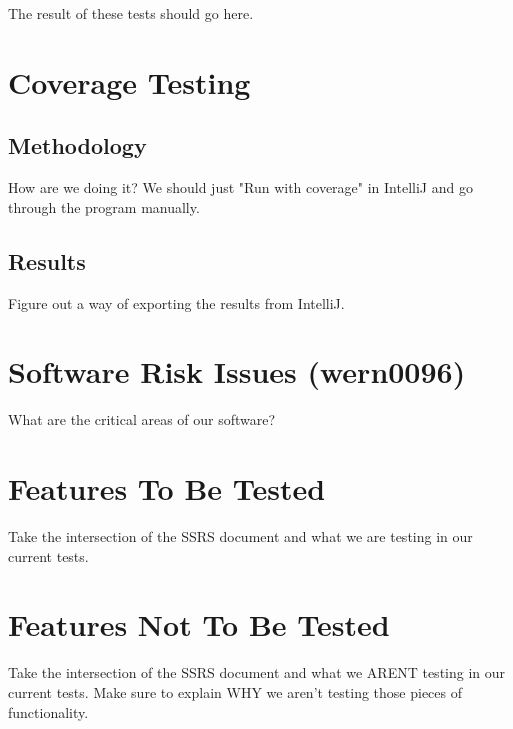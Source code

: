 \documentclass[14pt, a4paper]{article}
\begin{document}
The result of these tests should go here.

\newpage

\section{Coverage Testing}

\subsection{Methodology}

How are we doing it? We should just "Run with coverage" in IntelliJ and go through the program manually.

\newpage

\subsection{Results}

Figure out a way of exporting the results from IntelliJ.

\newpage
\section{Software Risk Issues (wern0096)}

What are the critical areas of our software?


\newpage
\section{Features To Be Tested}

Take the intersection of the SSRS document and what we are testing in our current tests.

\newpage
\section{Features Not To Be Tested}


Take the intersection of the SSRS document and what we ARENT testing in our current tests. Make sure to explain WHY we aren't testing those pieces of functionality.
\end{document}
